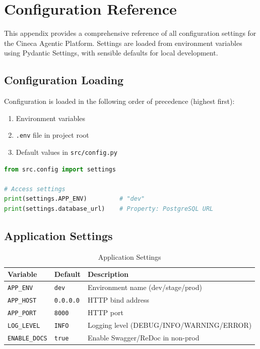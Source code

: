 
\chapter{Configuration Reference}
\label{app:config-reference}

This appendix provides a comprehensive reference of all configuration settings for the Cineca Agentic Platform. Settings are loaded from environment variables using Pydantic Settings, with sensible defaults for local development.

\section{Configuration Loading}
\label{app:config:loading}

Configuration is loaded in the following order of precedence (highest first):
\begin{enumerate}
    \item Environment variables
    \item \texttt{.env} file in project root
    \item Default values in \texttt{src/config.py}
\end{enumerate}

\begin{lstlisting}[language=Python]
from src.config import settings

# Access settings
print(settings.APP_ENV)         # "dev"
print(settings.database_url)    # Property: PostgreSQL URL
\end{lstlisting}

\section{Application Settings}
\label{app:config:app}

\begin{table}[ht]
\centering
\caption{Application Settings}
\label{tab:config-app}
\small
\begin{tabularx}{\textwidth}{llX}
    \hline
    \textbf{Variable} & \textbf{Default} & \textbf{Description} \\
    \hline
    \texttt{APP\_ENV} & \texttt{dev} & Environment name (dev/stage/prod) \\
    \texttt{APP\_HOST} & \texttt{0.0.0.0} & HTTP bind address \\
    \texttt{APP\_PORT} & \texttt{8000} & HTTP port \\
    \texttt{LOG\_LEVEL} & \texttt{INFO} & Logging level (DEBUG/INFO/WARNING/ERROR) \\
    \texttt{ENABLE\_DOCS} & \texttt{true} & Enable Swagger/ReDoc in non-prod \\
    \hline
\end{tabularx}
\end{table}

